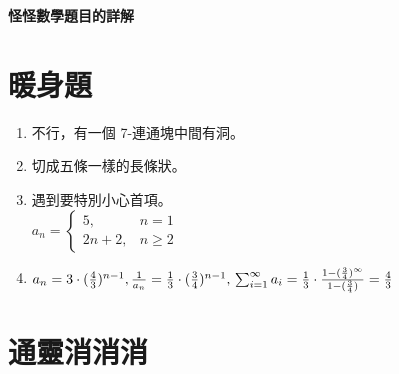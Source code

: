 \documentclass[12pt]{article}
\newcommand{\testtitle}[1]{ \begin{center}{\large\bf #1}\end{center} }
\begin{document}
\testtitle{怪怪數學題目的詳解}

\section{暖身題}

\begin{enumerate}
	\item 不行，有一個 7-連通塊中間有洞。
	\item 切成五條一樣的長條狀。
	\item 遇到要特別小心首項。\\
		\(a_n = \begin{cases}
			5,      & n = 1\\
			2n + 2, & n \ge 2
		\end{cases}\)
		\item $a_n = 3 \cdot (\frac{4}{3}) ^ {n-1}, \frac{1}{a_n} = \frac{1}{3} \cdot (\frac{3}{4}) ^ {n-1},\\ \sum _ {i = 1} ^ {\infty} a_i = \frac{1}{3} \cdot \frac{1 - (\frac{3}{4}) ^ {\infty}}{1 - (\frac{3}{4})} = \frac{4}{3}$
\end{enumerate}

\section{通靈消消消}
\end{document}
